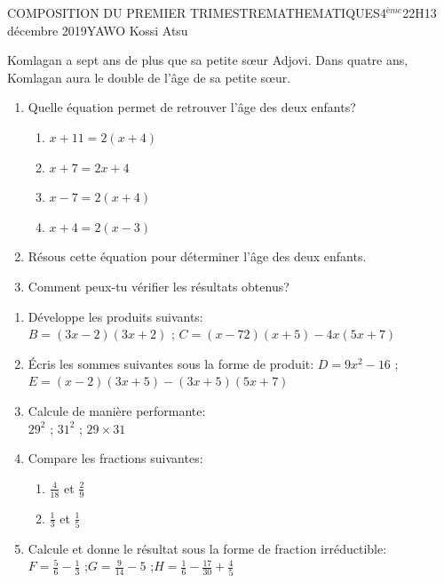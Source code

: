 \documentclass[12pt,a4paper]{book}
\newcommand{\prof}{YAWO Kossi Atsu}
\newcommand{\matiere}{MATHEMATIQUES}
\newcommand{\classe}{4$^{ème}$}
\begin{document}
\begin{devoir}{COMPOSITION DU PREMIER TRIMESTRE}{\matiere}{\classe}{2}{2H}{13 décembre 2019}{\prof}
\begin{exo}[3]
Komlagan a sept ans de plus que sa petite sœur Adjovi. Dans quatre ans, Komlagan aura le double de l'âge de sa petite sœur.
\begin{enumerate}
\item Quelle équation permet de retrouver l'âge des deux enfants?
\begin{multicols}{4}
\begin{enumerate}
\item $x+11=2(x+4)$
\item $x+7=2x+4$
\item $x-7=2(x+4)$
\item $x+4=2(x-3)$
\end{enumerate}
\end{multicols}
\item Résous cette équation pour déterminer l'âge des deux enfants.
\item Comment peux-tu vérifier les résultats obtenus?
\end{enumerate}

\end{exo}

\begin{exo}[6]
\begin{multicols}{2}
\begin{enumerate}
\item Développe les produits suivants:\\
$B=(3x-2)(3x+2)$  \qquad ; \qquad $C=(x-72)(x+5)-4x(5x+7)$
\item Écris les sommes suivantes sous la forme de produit:
$D=9x^2-16$  \qquad ; \qquad $E=(x-2)(3x+5)-(3x+5)(5x+7)$
\item Calcule de manière performante:\\
$29^2$ \qquad ; \qquad $31^2$ \qquad ; \qquad $29 \times 31$ \\
\item Compare les fractions suivantes:
\begin{multicols}{2}
\begin{enumerate}
\item $\frac{4}{18}$ et $\frac{2}{9}$
\item $\frac{1}{3}$ et $\frac{1}{5}$
\end{enumerate}
\end{multicols}
\item Calcule et donne le résultat sous la forme de fraction irréductible:\\
$F=\frac{5}{6}-\frac{1}{3}$ \qquad;\qquad $G=\frac{9}{14}-5$ \qquad;\qquad $H=\frac{1}{6}-\frac{17}{30}+\frac{4}{5}$
\end{enumerate}
\end{multicols}
\end{exo}


\end{devoir}
\end{document}
